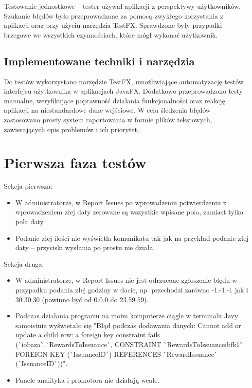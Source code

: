 \documentclass[a4paper,12pt]{article}
\begin{document}
Testowanie jednostkowe – tester używał aplikacji z perspektywy użytkowników.
Szukanie błędów było przeprowadzane za pomocą zwykłego korzystania z aplikacji oraz przy użyciu narzędzia TestFX.
Sprawdzone były przypadki brzegowe we wszystkich czynnościach, które mógł wykonać użytkownik.

\subsection{Implementowane techniki i narzędzia}


Do testów wykorzystano narzędzie TestFX, umożliwiające automatyzację testów interfejsu użytkownika w aplikacjach JavaFX.
Dodatkowo przeprowadzono testy manualne, weryfikujące poprawność działania funkcjonalności oraz reakcję aplikacji na niestandardowe dane wejściowe.
W celu śledzenia błędów zastosowano prosty system raportowania w formie plików tekstowych, zawierających opis problemów i ich priorytet.


\section{Pierwsza faza testów}

Sekcja pierwsza:
\begin{itemize}
    \item W administratorze, w Report Issues po wprowadzeniu potwierdzeniu z wprowadzeniem złej daty zerowane są wszystkie wpisane pola, zamiast tylko pola daty.
    \item Podanie złej ilości nie wyświetla komunikatu tak jak na przykład podanie złej daty -- przyciski wysłania po prostu nie działa.
\end{itemize}

Sekcja druga:
\begin{itemize}
    \item W administratorze, w Report Issues nie jest odrzucone zgłoszenie błędu w przypadku podania złej godziny w dacie, np. przechodzi zarówno -1.-1.-1 jak i 30.30.30 (powinno być od 0.0.0 do 23.59.59).
    \item Podczas działania programu na moim komputerze ciągle w terminalu Javy samoistnie wyświetało się "Błąd podczas dodawania danych: Cannot add or update a child row: a foreign key constraint fails (\`{}io\textunderscore{}baza\`{}.\`{}RewardsToIssuance\`{}, CONSTRAINT \`{}RewardsToIssuance\textunderscore{}ibfk\textunderscore{}1\`{} FOREIGN KEY (\`{}IssuanceID\`{}) REFERENCES \`{}RewardIssuance\`{} (\`{}IssuanceID\`{}))".
    \item Panele analityka i promotora nie działają wcale.
\end{itemize}
\end{document}
